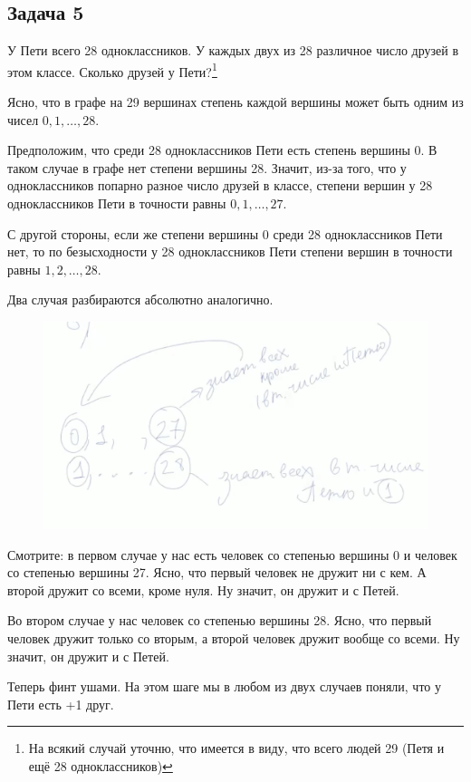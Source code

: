 \subsection{Задача 5}
У Пети всего 28 одноклассников. У каждых двух из 28 различное число друзей в этом классе. Сколько друзей у Пети?\footnote{На всякий случай уточню, что имеется в виду, что всего людей 29 (Петя и ещё 28 одноклассников)}
\begin{solution*}
Ясно, что в графе на 29 вершинах степень каждой вершины может быть одним из чисел $0, 1, \ldots, 28$.

Предположим, что среди 28 одноклассников Пети есть степень вершины 0. В таком случае в графе нет степени вершины 28. Значит, из-за того, что у одноклассников попарно разное число друзей в классе, степени вершин у 28 одноклассников Пети в точности равны $0, 1, \ldots, 27$.

С другой стороны, если же степени вершины 0 среди 28 одноклассников Пети нет, то по безысходности у 28 одноклассников Пети степени вершин в точности равны $1, 2, \ldots, 28$.

Два случая разбираются абсолютно аналогично.

\begin{figure}[H]
    \centering
    \includegraphics[width=0.75\linewidth]{Figures/sem08_task5.png}
\end{figure}

Смотрите: в первом случае у нас есть человек со степенью вершины 0 и человек со степенью вершины 27. Ясно, что первый человек не дружит ни с кем. А второй дружит со всеми, кроме нуля. Ну значит, он дружит и с Петей.

Во втором случае у нас человек со степенью вершины 28. Ясно, что первый человек дружит только со вторым, а второй человек дружит вообще со всеми. Ну значит, он дружит и с Петей.

Теперь финт ушами. На этом шаге мы в любом из двух случаев поняли, что у Пети есть +1 друг.


\end{solution*}
